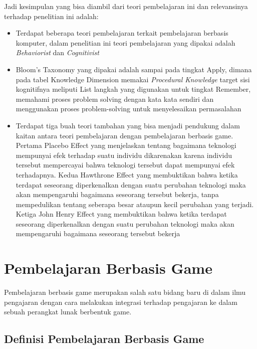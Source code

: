	Jadi kesimpulan yang bisa diambil dari teori pembelajaran ini dan relevansinya terhadap penelitian ini adalah:
	\begin{itemize}
		\item Terdapat beberapa teori pembelajaran terkait pembelajaran berbasis komputer, dalam penelitian ini teori pembelajaran yang dipakai adalah \textit{Behaviorist} dan \textit{Cognitivist}
		\item Bloom's Taxonomy yang dipakai adalah sampai pada tingkat Apply, dimana pada tabel Knowledge Dimension memakai \textit{Procedural Knowledge} target sisi kognitifnya meliputi List langkah yang digunakan untuk tingkat Remember, memahami proses problem solving dengan kata kata sendiri dan menggunakan proses problem-solving untuk menyelesaikan permasalahan
		\item Terdapat tiga buah teori tambahan yang bisa menjadi pendukung dalam kaitan antara teori pembelajaran dengan pembelajaran berbasis game. Pertama Placebo Effect yang menjelaskan tentang bagaimana teknologi mempunyai efek terhadap suatu individu dikarenakan karena individu tersebut mempercayai bahwa teknologi tersebut dapat mempunyai efek terhadapnya. Kedua Hawthrone Effect yang membuktikan bahwa ketika terdapat seseorang diperkenalkan dengan suatu perubahan teknologi maka akan mempengaruhi bagaimana seseorang tersebut bekerja, tanpa mempedulikan tentang seberapa besar ataupun kecil perubahan yang terjadi. Ketiga John Henry Effect yang membuktikan bahwa ketika terdapat seseorang diperkenalkan dengan suatu perubahan teknologi maka akan mempengaruhi bagaimana seseorang tersebut bekerja
	\end{itemize}
	
\section{Pembelajaran Berbasis Game}
Pembelajaran berbasis game merupakan salah satu bidang baru di dalam ilmu pengajaran dengan cara melakukan integrasi terhadap pengajaran ke dalam sebuah perangkat lunak berbentuk game. 

	\subsection{Definisi Pembelajaran Berbasis Game}
	
